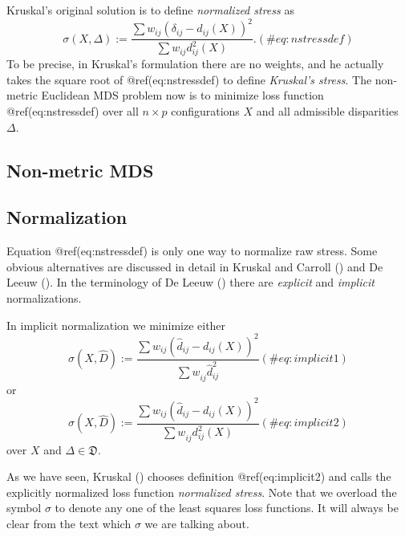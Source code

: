 \documentclass[
  12pt,
  letterpaper,
  DIV=11,
  numbers=noendperiod]{scrartcl}
\theoremstyle{plain}
\theoremstyle{remark}
\begin{document}
Kruskal's original solution is to define \emph{normalized stress} as
\begin{equation}
\sigma(X,\Delta):=\frac{\sum w_{ij}(\delta_{ij}-d_{ij}(X))^2}{\sum w_{ij}d_{ij}^2(X)}.
(\#eq:nstressdef)
\end{equation} To be precise, in Kruskal's formulation there are no
weights, and he actually takes the square root of @ref(eq:nstressdef) to
define \emph{Kruskal's stress}. The non-metric Euclidean MDS problem now
is to minimize loss function @ref(eq:nstressdef) over all \(n\times p\)
configurations \(X\) and all admissible disparities \(\Delta\).

\subsection{Non-metric MDS}\label{non-metric-mds}

\subsection{Normalization}\label{normalization}

Equation @ref(eq:nstressdef) is only one way to normalize raw stress.
Some obvious alternatives are discussed in detail in Kruskal and Carroll
() and De Leeuw
(). In the terminology of De Leeuw
() there are \emph{explicit} and
\emph{implicit} normalizations.

In implicit normalization we minimize either \begin{equation}
\sigma(X,\hat D):=\frac{\sum  w_{ij}(\hat d_{ij} -d_{ij}(X))^2}{\sum   w_{ij}^{\ }\hat d_{ij}^2}
(\#eq:implicit1)
\end{equation} or \begin{equation}
\sigma(X,\hat D):=\frac{\sum   w_{ij}(\hat d_{ij}-d_{ij}(X))^2}{\sum   w_{ij}^{\ }d_{ij}^2(X) }
(\#eq:implicit2)
\end{equation} over \(X\) and \(\Delta\in\mathfrak{D}\).

As we have seen, Kruskal () chooses
definition @ref(eq:implicit2) and calls the explicitly normalized loss
function \emph{normalized stress}. Note that we overload the symbol
\(\sigma\) to denote any one of the least squares loss functions. It
will always be clear from the text which \(\sigma\) we are talking
about.
\end{document}
